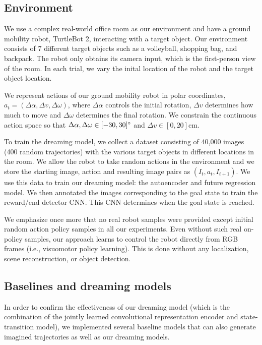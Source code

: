 \documentclass[letterpaper, 10 pt, conference]{ieeeconf}
\begin{document}
\subsection{Environment}
We use a complex real-world office room as our environment and have a ground mobility robot, TurtleBot 2, interacting with a target object. Our environment consists of 7 different target objects such as a volleyball, shopping bag, and backpack. The robot only obtains its camera input, which is the first-person view of the room. In each trial, we vary the inital location of the robot and the target object location.

We represent actions of our ground mobility robot in polar coordinates, $a_t = (\Delta\alpha, \Delta v, \Delta\omega)$, where $\Delta\alpha$ controls the initial rotation, $\Delta v$ determines how much to move and $\Delta\omega$ determines the final rotation. We constrain the continuous action space so that $\Delta\alpha,\Delta\omega\in [-30, 30]\degree$ and $\Delta v\in [0,20]$cm.%

To train the dreaming model, we collect a dataset consisting of 40,000 images (400 random trajectories) with the various target objects in different locations in the room. We allow the robot to take random actions in the environment and we store the starting image, action and resulting image pairs as $(I_t, a_t, I_{t+1})$. We use this data to train our dreaming model: the autoencoder and future regression model. 
We then annotated the images corresponding to the goal state to train the reward/end detector CNN. This CNN determines when the goal state is reached.

We emphasize once more that no real robot samples were provided except initial random action policy samples in all our experiments. Even without such real on-policy samples, our approach learns to control the robot directly from RGB frames (i.e., visuomotor policy learning). This is done without any localization, scene reconstruction, or object detection.

\subsection{Baselines and dreaming models}

In order to confirm the effectiveness of our dreaming model (which is the combination of the jointly learned convolutional representation encoder and state-transition model), we implemented several baseline models that can also generate imagined trajectories as well as our dreaming models.
\end{document}
